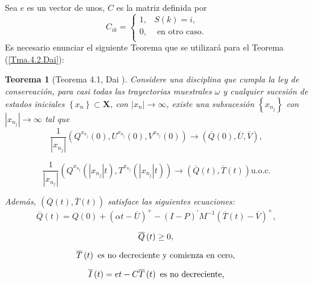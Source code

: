 \documentclass{article}
\newtheorem{Teo}{Teorema}[section]
\numberwithin{equation}{section}
\begin{document}
Sea $e$ es un vector de unos, $C$ es la matriz definida por
\[C_{ik}=\left\{\begin{array}{cc}
1,& S\left(k\right)=i,\\
0,& \textrm{ en otro caso}.\\
\end{array}\right.
\]
Es necesario enunciar el siguiente Teorema que se utilizar\'a para
el Teorema (\ref{Tma.4.2.Dai}):
\begin{Teo}[Teorema 4.1, Dai \cite{Dai}]
Considere una disciplina que cumpla la ley de conservaci\'on, para
casi todas las trayectorias muestrales $\omega$ y cualquier
sucesi\'on de estados iniciales $\left\{x_{n}\right\}\subset
\mathbf{X}$, con $|x_{n}|\rightarrow\infty$, existe una
subsucesi\'on $\left\{x_{n_{j}}\right\}$ con
$|x_{n_{j}}|\rightarrow\infty$ tal que
\begin{equation}\label{Eq.4.15}
\frac{1}{|x_{n_{j}}|}\left(Q^{x_{n_{j}}}\left(0\right),U^{x_{n_{j}}}\left(0\right),V^{x_{n_{j}}}\left(0\right)\right)\rightarrow\left(\overline{Q}\left(0\right),\overline{U},\overline{V}\right),
\end{equation}

\begin{equation}\label{Eq.4.16}
\frac{1}{|x_{n_{j}}|}\left(Q^{x_{n_{j}}}\left(|x_{n_{j}}|t\right),T^{x_{n_{j}}}\left(|x_{n_{j}}|t\right)\right)\rightarrow\left(\overline{Q}\left(t\right),\overline{T}\left(t\right)\right)\textrm{
u.o.c.}
\end{equation}

Adem\'as,
$\left(\overline{Q}\left(t\right),\overline{T}\left(t\right)\right)$
satisface las siguientes ecuaciones:
\begin{equation}\label{Eq.MF.1.3a}
\overline{Q}\left(t\right)=Q\left(0\right)+\left(\alpha
t-\overline{U}\right)^{+}-\left(I-P\right)^{'}M^{-1}\left(\overline{T}\left(t\right)-\overline{V}\right)^{+},
\end{equation}

\begin{equation}\label{Eq.MF.2.3a}
\overline{Q}\left(t\right)\geq0,\\
\end{equation}

\begin{equation}\label{Eq.MF.3.3a}
\overline{T}\left(t\right)\textrm{ es no decreciente y comienza en cero},\\
\end{equation}

\begin{equation}\label{Eq.MF.4.3a}
\overline{I}\left(t\right)=et-C\overline{T}\left(t\right)\textrm{
es no decreciente,}\\
\end{equation}


\end{Teo}
\end{document}
